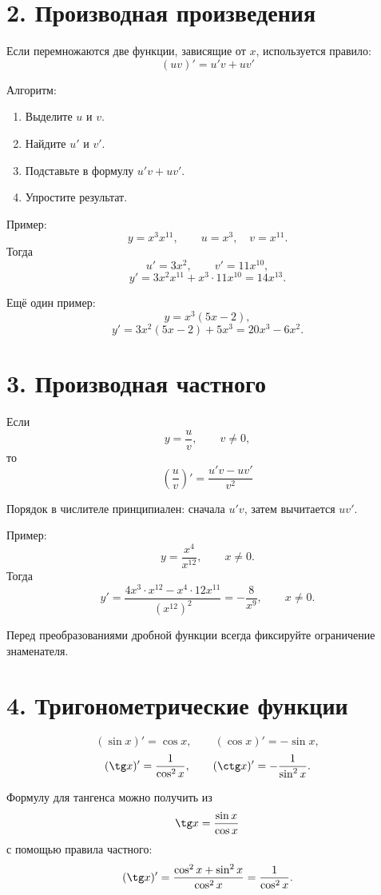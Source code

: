 \documentclass[a4paper,12pt]{article}
\newcommand{\sectionline}{\vspace{0.25em}{\color{accent}\rule{\linewidth}{0.8pt}}\vspace{0.45em}}
\newcommand{\keyformula}[1]{\[\boxed{\displaystyle #1}\]}
\begin{document}
\section*{\color{darkaccent}2. Производная произведения}
\sectionline

Если перемножаются две функции, зависящие от $x$, используется правило:
\keyformula{(uv)'=u'v+uv'}

Алгоритм:
\begin{enumerate}
\item Выделите $u$ и $v$.
\item Найдите $u'$ и $v'$.
\item Подставьте в формулу $u'v+uv'$.
\item Упростите результат.
\end{enumerate}

Пример:
\[
y=x^3x^{11},\qquad u=x^3,\quad v=x^{11}.
\]
Тогда
\[
u'=3x^2,\qquad v'=11x^{10},
\]
\[
y'=3x^2x^{11}+x^3\cdot11x^{10}=14x^{13}.
\]

Ещё один пример:
\[
y=x^3(5x-2),
\]
\[
y'=3x^2(5x-2)+5x^3=20x^3-6x^2.
\]

\section*{\color{darkaccent}3. Производная частного}
\sectionline

Если
\[
y=\frac{u}{v},\qquad v\ne0,
\]
то
\keyformula{\left(\frac uv\right)'=\frac{u'v-uv'}{v^2}}

Порядок в числителе принципиален: сначала $u'v$, затем вычитается $uv'$.

Пример:
\[
y=\frac{x^4}{x^{12}},\qquad x\ne0.
\]
Тогда
\[
y'=\frac{4x^3\cdot x^{12}-x^4\cdot12x^{11}}{(x^{12})^2}
=-\frac8{x^9},\qquad x\ne0.
\]

Перед преобразованиями дробной функции всегда фиксируйте ограничение знаменателя.

\section*{\color{darkaccent}4. Тригонометрические функции}
\sectionline

\[
(\sin x)'=\cos x,
\qquad
(\cos x)'=-\sin x,
\]
\[
(\tg x)'=\frac1{\cos^2x},
\qquad
(\ctg x)'=-\frac1{\sin^2x}.
\]

Формулу для тангенса можно получить из
\[
\tg x=\frac{\sin x}{\cos x}
\]
с помощью правила частного:
\[
(\tg x)'=
\frac{\cos^2x+\sin^2x}{\cos^2x}
=\frac1{\cos^2x}.
\]
\end{document}
